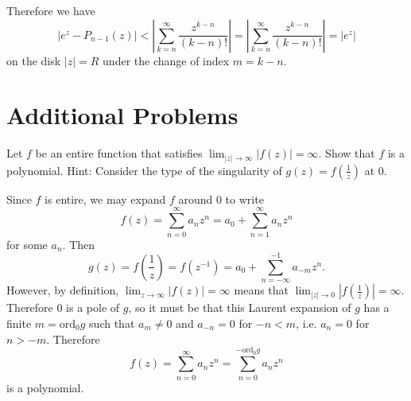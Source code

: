 \documentclass{article}
\newcommand\ord{\mathrm{ord}}
\newcounter{Problem}
\newenvironment{Problem}{\begin{Exercise}[name={Problem},
                                          counter={Problem}]}
                        {\end{Exercise}}
\begin{document}
Therefore we have
$$
  |e^z - P_{n-1}(z)| 
< \left|
    \sum_{k=n}^\infty
      \frac{z^{k-n}}
           {(k-n)!}
  \right|
= \left|
    \sum_{k=n}^\infty
      \frac{z^{k-n}}
           {(k-n)!}
  \right|
= |e^z|
$$
on the disk $|z| = R$ under the change of index $m = k - n$.

\section{Additional Problems}
\begin{Problem}
Let $f$ be an entire function that satisfies
$\lim_{|z| \to \infty} |f(z)| = \infty$. Show that $f$ is a polynomial.
Hint: Consider the type of the singularity of $g(z) = f(\frac{1}{z})$
at 0.
\end{Problem}

\begin{Answer}
Since $f$ is entire, we may expand $f$ around 0 to write
$$
  f(z) 
= \sum_{n=0}^\infty a_n z^n 
= a_0 + \sum_{n=1}^\infty a_n z^n
$$
for some $a_n$. Then
$$
  g(z)
= f\left(\frac{1}{z}\right) 
= f(z^{-1}) 
= a_0 + \sum_{n=-\infty}^{-1} a_{-m} z^n.
$$
However, by definition, $\lim _{z \to \infty} |f(z)| = \infty$ means that
$\lim_{|z| \to 0} \left|f\left(\frac{1}{z}\right)\right| = \infty$. 
Therefore 0 is a pole of $g$, so it must be
that this Laurent expansion of $g$ has a finite $m = \ord_{0} g$
such that $a_{m} \neq 0$ and $a_{-n} = 0$ for $-n < m$, i.e.
$a_n = 0$ for $n > -m$. Therefore 
$$
  f(z) 
= \sum_{n=0}^\infty a_n z^n
= \sum_{n=0}^{-\ord_0 g} a_n z^n 
$$
is a polynomial.
\end{Answer}
\end{document}
